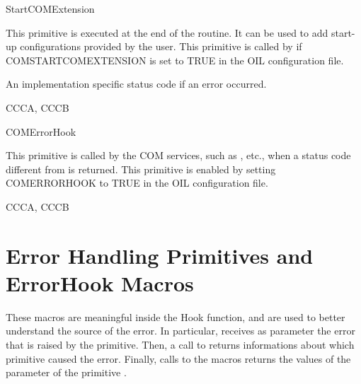 
\begin{function_nopb}{StartCOMExtension}
  \begin{fundescription}
    This primitive is executed at the end of the  routine. It can
    be used to add start-up configurations provided by the user. This 
    primitive is called by  if COMSTARTCOMEXTENSION  is set to 
    TRUE in the OIL configuration file. 
  \end{fundescription}
  \begin{funreturn}
   \fret{} {An implementation specific status code if an error occurred.}
   \end{funreturn}
  \begin{funconformance}
    CCCA, CCCB
  \end{funconformance}
\end{function_nopb}

\begin{function_nopb}{COMErrorHook}
  \begin{fundescription}
    This primitive is called by the COM services, such as , 
     etc., when a status code different from  is 
     returned. This primitive is enabled by setting COMERRORHOOK to TRUE in 
     the OIL configuration file. 
  \end{fundescription}
  \begin{funparameters}
  \end{funparameters}
  \begin{funconformance}
    CCCA, CCCB
  \end{funconformance}
\end{function_nopb}


\pagebreak


\section{Error Handling Primitives and ErrorHook Macros}
\label{sec:errorhook-macros}
These macros are meaningful inside the  Hook
function, and are used to better understand the source of the
error. In particular,  receives as parameter the
error that is raised by the primitive. Then, a call to
 returns informations about which
primitive caused the error. Finally, calls to the macros
 returns the values of the  parameter
of the primitive . 

